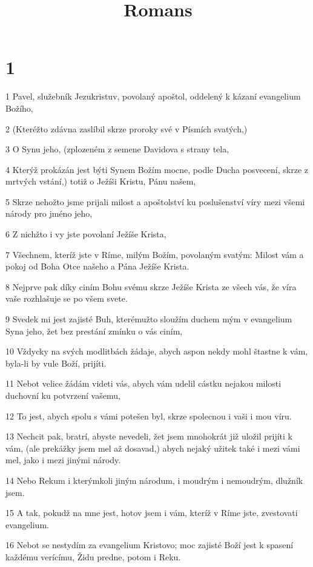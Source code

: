

\title{Romans}

\chapter{1}

\par 1 Pavel, služebník Jezukristuv, povolaný apoštol, oddelený k kázaní evangelium Božího,
\par 2 (Kteréžto zdávna zaslíbil skrze proroky své v Písmích svatých,)
\par 3 O Synu jeho, (zplozeném z semene Davidova s strany tela,
\par 4 Kterýž prokázán jest býti Synem Božím mocne, podle Ducha posvecení, skrze z mrtvých vstání,) totiž o Ježíši Kristu, Pánu našem,
\par 5 Skrze nehožto jsme prijali milost a apoštolství ku poslušenství víry mezi všemi národy pro jméno jeho,
\par 6 Z nichžto i vy jste povolaní Ježíše Krista,
\par 7 Všechnem, kteríž jste v Ríme, milým Božím, povolaným svatým: Milost vám a pokoj od Boha Otce našeho a Pána Ježíše Krista.
\par 8 Nejprve pak díky ciním Bohu svému skrze Ježíše Krista ze všech vás, že víra vaše rozhlašuje se po všem svete.
\par 9 Svedek mi jest zajisté Buh, kterémužto sloužím duchem mým v evangelium Syna jeho, žet bez prestání zmínku o vás ciním,
\par 10 Vždycky na svých modlitbách žádaje, abych aspon nekdy mohl štastne k vám, byla-li by vule Boží, prijíti.
\par 11 Nebot velice žádám videti vás, abych vám udelil cástku nejakou milosti duchovní ku potvrzení vašemu,
\par 12 To jest, abych spolu s vámi potešen byl, skrze spolecnou i vaši i mou víru.
\par 13 Nechcit pak, bratrí, abyste nevedeli, žet jsem mnohokrát již uložil prijíti k vám, (ale prekážky jsem mel až dosavad,) abych nejaký užitek také i mezi vámi mel, jako i mezi jinými národy.
\par 14 Nebo Rekum i kterýmkoli jiným národum, i moudrým i nemoudrým, dlužník jsem.
\par 15 A tak, pokudž na mne jest, hotov jsem i vám, kteríž v Ríme jste, zvestovati evangelium.
\par 16 Nebot se nestydím za evangelium Kristovo; moc zajisté Boží jest k spasení každému verícímu, Židu predne, potom i Reku.
